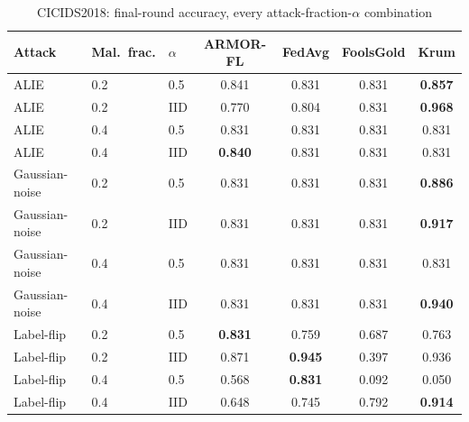 \documentclass[a4paper,11pt]{article}
\begin{document}
\begin{table}[htbp]
\centering
\caption{CICIDS2018: final-round accuracy, every attack-fraction-$\alpha$ combination}\label{tab:appcicids2018}
\begin{tabular}{@{}lllcccc@{}}
\toprule
Attack & Mal.\ frac. & $\alpha$ & ARMOR-FL & FedAvg & FoolsGold & Krum \\
\midrule
ALIE & 0.2 & 0.5 & 0.841 & 0.831 & 0.831 & \textbf{0.857} \\
ALIE & 0.2 & IID & 0.770 & 0.804 & 0.831 & \textbf{0.968} \\
ALIE & 0.4 & 0.5 & 0.831 & 0.831 & 0.831 & 0.831 \\
ALIE & 0.4 & IID & \textbf{0.840} & 0.831 & 0.831 & 0.831 \\
Gaussian-noise & 0.2 & 0.5 & 0.831 & 0.831 & 0.831 & \textbf{0.886} \\
Gaussian-noise & 0.2 & IID & 0.831 & 0.831 & 0.831 & \textbf{0.917} \\
Gaussian-noise & 0.4 & 0.5 & 0.831 & 0.831 & 0.831 & 0.831 \\
Gaussian-noise & 0.4 & IID & 0.831 & 0.831 & 0.831 & \textbf{0.940} \\
Label-flip & 0.2 & 0.5 & \textbf{0.831} & 0.759 & 0.687 & 0.763 \\
Label-flip & 0.2 & IID & 0.871 & \textbf{0.945} & 0.397 & 0.936 \\
Label-flip & 0.4 & 0.5 & 0.568 & \textbf{0.831} & 0.092 & 0.050 \\
Label-flip & 0.4 & IID & 0.648 & 0.745 & 0.792 & \textbf{0.914} \\
\bottomrule
\end{tabular}
\end{table}
\end{document}
